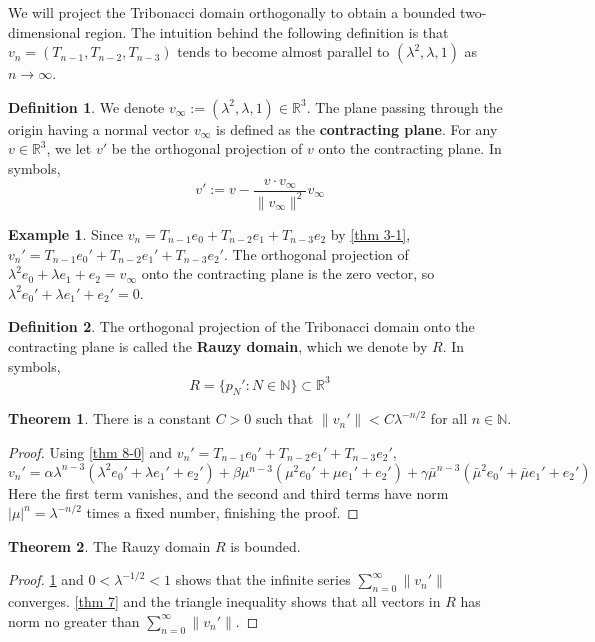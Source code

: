 \documentclass{article}
\theoremstyle{definition}
\newtheorem{theorem}{Theorem}
\newtheorem*{definition}{Definition}
\newtheorem*{example}{Example}
\begin{document}
We will project the Tribonacci domain orthogonally to obtain a bounded two-dimensional region. The intuition behind the following definition is that 
\(
v_n=(T_{n-1}, T_{n-2}, T_{n-3})
\)
tends to become almost parallel to $(\lambda^2, \lambda, 1)$ as $n\rightarrow \infty$.

\begin{definition}
We denote $v_\infty:=(\lambda^2, \lambda, 1)\in \mathbb{R}^3$. The plane passing through the origin having a normal vector $v_\infty$ is defined as the \textbf{contracting plane}. For any $v\in \mathbb{R}^3$, we let $v'$ be the orthogonal projection of $v$ onto the contracting plane. In symbols,  \[v':=v-\frac{v\cdot v_\infty}{\|v_\infty \|^2}v_\infty\] 
\end{definition}

\begin{example}
Since $v_n=T_{n-1}e_0+T_{n-2}e_1+T_{n-3}e_2$ by \cref{thm 3-1}, $v_n'=T_{n-1}e_0'+T_{n-2}e_1'+T_{n-3}e_2'$. The orthogonal projection of $\lambda^2e_0+\lambda e_1+e_2=v_\infty$ onto the contracting plane is the zero vector, so $\lambda^2e_0'+\lambda e_1'+e_2'=0$.
\end{example}

\begin{definition}
    The orthogonal projection of the Tribonacci domain onto the contracting plane is called the \textbf{Rauzy domain}, which we denote by $R$. In symbols, \[R=\{p_N':N\in \mathbb{N}\}\subset \mathbb{R}^3\]
\end{definition}

\begin{theorem}
    \label{thm 8}
    There is a constant $C>0$ such that $\|v_n' \|<C\lambda^{-n/2}$ for all $n\in \mathbb{N}$.
\end{theorem}
\begin{proof}
Using \cref{thm 8-0} and $v_n'=T_{n-1}e_0'+T_{n-2}e_1'+T_{n-3}e_2'$,
\[
v_n'=\alpha\lambda^{n-3}(\lambda^2e_0'+\lambda e_1'+e_2') + \beta\mu^{n-3}(\mu^2e_0'+\mu e_1'+e_2')+\gamma\bar{\mu}^{n-3}(\bar{\mu}^2e_0'+\bar{\mu} e_1'+e_2')
\]
Here the first term vanishes, and the second and third terms have norm $|\mu|^{n}=\lambda^{-n/2}$ times a fixed number, finishing the proof.
\end{proof}

\begin{theorem}
\label{thm 9}
    The Rauzy domain $R$ is bounded.
\end{theorem}
\begin{proof}
\cref{thm 8} and $0<\lambda^{-1/2}<1$ shows that the infinite series \(\sum_{n=0}^\infty \|v_n'\| \) converges. \cref{thm 7} and the triangle inequality shows that all vectors in $R$ has norm no greater than \(\sum_{n=0}^\infty \|v_n'\| \).
\end{proof}
\end{document}
